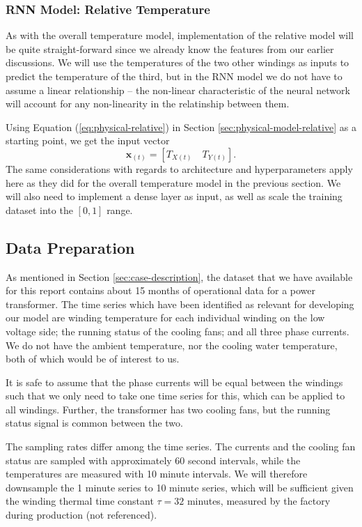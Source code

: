 \documentclass[]{article}
\begin{document}
\subsubsection{RNN Model: Relative Temperature} \label{sec:rnn-model-relative}
As with the overall temperature model, implementation of the relative model will be quite straight-forward since we already know the features from our earlier discussions. We will use the temperatures of the two other windings as inputs to predict the temperature of the third, but in the RNN model we do not have to assume a linear relationship -- the non-linear characteristic of the neural network will account for any non-linearity in the relatinship between them. 

Using Equation (\ref{eq:physical-relative}) in Section \ref{sec:physical-model-relative} as a starting point, we get the input vector 
\begin{equation}
	\mathbf{x}_{(t)} = [T_{X(t)} \quad T_{Y(t)}].
\end{equation}
The same considerations with regards to architecture and hyperparameters apply here as they did for the overall temperature model in the previous section. We will also need to implement a dense layer as input, as well as scale the training dataset into the $[0,1]$ range.

\subsection{Data Preparation} \label{sec:data-prep}
As mentioned in Section \ref{sec:case-description}, the dataset that we have available for this report contains about 15 months of operational data for a power transformer. The time series which have been identified as relevant for developing our model are winding temperature for each individual winding on the low voltage side; the running status of the cooling fans; and all three phase currents. We do not have the ambient temperature, nor the cooling water temperature, both of which would be of interest to us.

It is safe to assume that the phase currents will be equal between the windings such that we only need to take one time series for this, which can be applied to all windings. Further, the transformer has two cooling fans, but the running status signal is common between the two.

The sampling rates differ among the time series. The currents and the cooling fan status are sampled with approximately 60 second intervals, while the temperatures are measured with 10 minute intervals. We will therefore downsample the 1 minute series to 10 minute series, which will be sufficient given the winding thermal time constant $\tau = 32$ minutes, measured by the factory during production (not referenced).
\end{document}
